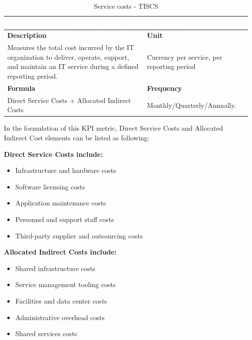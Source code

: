     \begin{table}[h]
        \centering
        \renewcommand{\arraystretch}{1.6}
        \setlength{\arrayrulewidth}{0.6pt}

        \begin{tabularx}{\textwidth}{|X|X|}
        \hline
        \multicolumn{2}{|c|}{\cellcolor{mcblue}\textcolor{white}{\textbf{Total IT Service Cost per Service}}} \\ \hline

        \rowcolor{mclightgray}
        \textbf{Description} & \textbf{Unit} \\ \hline
        Measures the total cost incurred by the IT organization to deliver, operate, support, and maintain an IT service during a defined reporting period. &
        Currency per service, per reporting period \\ \hline

        \rowcolor{mclightgray}
        \textbf{Formula} & \textbf{Frequency} \\ \hline
        Direct Service Costs + Allocated Indirect Costs &
        Monthly/Quarterly/Annually. \\ \hline

        \end{tabularx}

        \caption{Service costs - TISCS}
        \label{tab:measurement_ITcostperservice}
    \end{table}

In the formulation of this KPI metric, Direct Service Costs and Allocated Indirect Cost elements can be listed as following:

\textbf{Direct Service Costs include:}
\begin{itemize}
    \item Infrastructure and hardware costs
    \item Software licensing costs
    \item Application maintenance costs
    \item Personnel and support staff costs
    \item Third-party supplier and outsourcing costs
\end{itemize}

\textbf{Allocated Indirect Costs include:}
\begin{itemize}
    \item Shared infrastructure costs
    \item Service management tooling costs
    \item Facilities and data center costs
    \item Administrative overhead costs
    \item Shared services costs
\end{itemize}


